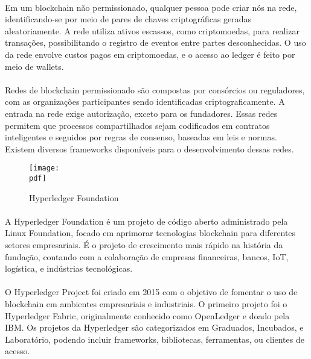 \documentclass[letterpaper,11pt,leqno]{article}
\newcommand{\pdf}{figures/figures}
\begin{document}
\paragraph{}
Em um blockchain não permissionado, qualquer pessoa pode criar nós na rede,
identificando-se por meio de pares de chaves criptográficas geradas
aleatoriamente. A rede utiliza ativos escassos, como criptomoedas, para realizar
transações, possibilitando o registro de eventos entre partes desconhecidas. O
uso da rede envolve custos pagos em criptomoedas, e o acesso ao ledger é feito
por meio de wallets.

\paragraph{}
Redes de blockchain permissionado são compostas por consórcios ou reguladores,
com as organizações participantes sendo identificadas criptograficamente. A
entrada na rede exige autorização, exceto para os fundadores. Essas redes
permitem que processos compartilhados sejam codificados em contratos
inteligentes e seguidos por regras de consenso, baseadas em leis e normas.
Existem diversos frameworks disponíveis para o desenvolvimento dessas redes.

\begin{figure}[H]
	{\texttt{[image: \\pdf]}}
	\caption{Hyperledger Foundation}
	\label{f:figure2}\end{figure}

\paragraph{}
A Hyperledger Foundation é um projeto de código aberto administrado pela Linux
Foundation, focado em aprimorar tecnologias blockchain para diferentes setores
empresariais. É o projeto de crescimento mais rápido na história da fundação,
contando com a colaboração de empresas financeiras, bancos, IoT, logística, e
indústrias tecnológicas.

\paragraph{}
O Hyperledger Project foi criado em 2015 com o objetivo de fomentar o uso de
blockchain em ambientes empresariais e industriais. O primeiro projeto foi o
Hyperledger Fabric, originalmente conhecido como OpenLedger e doado pela IBM. Os
projetos da Hyperledger são categorizados em Graduados, Incubados, e
Laboratório, podendo incluir frameworks, bibliotecas, ferramentas, ou clientes
de acesso.
\end{document}
